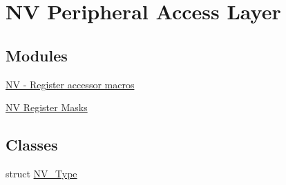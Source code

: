 \hypertarget{group__NV__Peripheral__Access__Layer}{}\section{NV Peripheral Access Layer}
\label{group__NV__Peripheral__Access__Layer}
\subsection*{Modules}
\begin{DoxyCompactItemize}
\item 
\hyperlink{group__NV__Register__Accessor__Macros}{N\+V -\/ Register accessor macros}
\item 
\hyperlink{group__NV__Register__Masks}{N\+V Register Masks}
\end{DoxyCompactItemize}
\subsection*{Classes}
\begin{DoxyCompactItemize}
\item 
struct \hyperlink{structNV__Type}{N\+V\+\_\+\+Type}
\end{DoxyCompactItemize}
